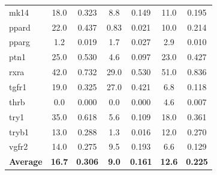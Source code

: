 \documentclass[11pt]{article}
\begin{document}
\begin{longtable}{@{\extracolsep{\fill}}lcccccc@{}}
mk14 & 18.0 & 0.323 & 8.8 & 0.149 & 11.0 & 0.195 \\
ppard & 22.0 & 0.437 & 0.83 & 0.021 & 10.0 & 0.214 \\
pparg & 1.2 & 0.019 & 1.7 & 0.027 & 2.9 & 0.010 \\
ptn1 & 25.0 & 0.530 & 4.6 & 0.097 & 23.0 & 0.427 \\
rxra & 42.0 & 0.732 & 29.0 & 0.530 & 51.0 & 0.836 \\
tgfr1 & 19.0 & 0.325 & 27.0 & 0.421 & 6.8 & 0.118 \\
thrb & 0.0 & 0.000 & 0.0 & 0.000 & 4.6 & 0.007 \\
try1 & 35.0 & 0.618 & 5.6 & 0.109 & 18.0 & 0.361 \\
tryb1 & 13.0 & 0.288 & 1.3 & 0.016 & 12.0 & 0.270 \\
vgfr2 & 14.0 & 0.275 & 9.5 & 0.193 & 6.6 & 0.129 \\
\midrule
\textbf{Average} & \textbf{16.7} & \textbf{0.306} & \textbf{9.0} & \textbf{0.161} & \textbf{12.6} & \textbf{0.225} \\
\end{longtable}



\end{document}
